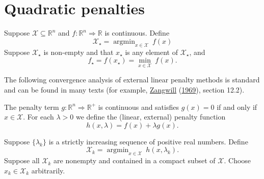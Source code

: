 \documentclass[
  12pt,
]{book}
\theoremstyle{definition}
\theoremstyle{definition}
\theoremstyle{definition}
\theoremstyle{definition}
\theoremstyle{remark}
\begin{document}
\hypertarget{mathpenal}{%
\section{Quadratic penalties}\label{mathpenal}}

Suppose \(\mathcal{X}\subseteq\mathbb{R}^n\) and \(f:\mathbb{R}^n\Rightarrow\mathbb{R}\) is continuous. Define
\[
\mathcal{X}_\star=\mathop{\text{argmin}}_{x\in\mathcal{X}}\ f(x)
\]
Suppose \(\mathcal{X}_\star\) is non-empty and that \(x_\star\) is any element of \(\mathcal{X}_\star\), and
\[
f_\star=f(x_\star)=\min_{x\in\mathcal{X}}\ f(x).
\]

The following convergence analysis of external linear penalty methods is standard and can be found in many texts (for example, \protect\hyperlink{ref-zangwill_69}{Zangwill} (\protect\hyperlink{ref-zangwill_69}{1969}), section 12.2).

The penalty term \(g:\mathbb{R}^n\Rightarrow\mathbb{R}^+\) is continuous and satisfies \(g(x)=0\) if and only if \(x\in\mathcal{X}\). For each \(\lambda>0\) we define the (linear, external) penalty function
\begin{equation}
h(x,\lambda)=f(x)+\lambda g(x).
\end{equation}

Suppose \(\{\lambda_k\}\) is a strictly increasing sequence of positive real numbers. Define
\begin{equation}
\mathcal{X}_k=\mathop{\text{argmin}}_{x\in\mathcal{X}}\ h(x,\lambda_k).
\end{equation}
Suppose all \(\mathcal{X}_k\) are nonempty and contained in a compact subset of \(\mathcal{X}\). Choose \(x_k\in\mathcal{X}_k\) arbitrarily.
\end{document}

